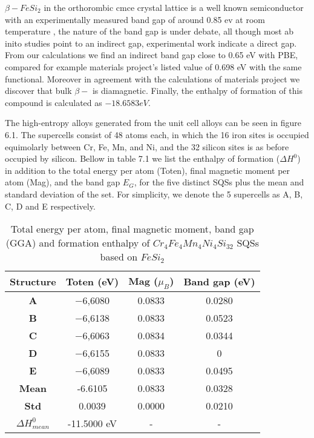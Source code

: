$\beta-FeSi_2$ in the orthorombic cmce crystal lattice is a well known semiconductor with an experimentally measured band gap of around 0.85 ev at room temperature \cite{PhysRevB.58.10389}, the nature of the band gap is under debate, all though most ab inito studies point to an indirect gap, experimental work indicate a direct gap. From our calculations we find an indirect band gap close to 0.65 eV with PBE, compared for example materials project's listed value of 0.698 eV with the same functional. Moreover in agreement with the calculations of materials project we discover that bulk $\beta-$  is diamagnetic. Finally, the enthalpy of formation of this compound is calculated as $-18.6583 eV$.

The high-entropy alloys generated from the  unit cell alloys can be seen in figure 6.1. The supercells consist of 48 atoms each, in which the 16 iron sites is occupied equimolarly between Cr, Fe, Mn, and Ni, and the 32 silicon sites is as before occupied by silicon. Bellow in table 7.1 we list the enthalpy of formation ($\Delta H^0$) in addition to the total energy per atom (Toten), final magnetic moment per atom (Mag), and the band gap $E_G$, for the five distinct SQSs plus the mean and standard deviation of the set. For simplicity, we denote the 5 supercells as A, B, C, D and E respectively.

\begin{table}[H]
\centering
\begin{tabular}{@{}cccc@{}}
\toprule
Structure  & Toten (eV) & Mag ($\mu_B$) & Band gap (eV) \\ \midrule
\textbf{A} & −6,6080                & 0.0833                    & 0.0280        \\
\textbf{B} & −6,6138                & 0.0833                    & 0.0523        \\
\textbf{C} & −6,6063                & 0.0834                    & 0.0344        \\
\textbf{D} & −6,6155                & 0.0833                    & 0             \\
\textbf{E} & −6,6089                & 0.0833                    & 0.0495        \\ \midrule
\textbf{Mean} & -6.6105 & 0.0833 & 0.0328    \\
\textbf{Std} & 0.0039 &  0.0000 &  0.0210 \\
\textbf{$\Delta H_{mean}^0$} & -11.5000 eV & - & - \\ \bottomrule
\end{tabular}
\caption{Total energy per atom, final magnetic moment, band gap (GGA) and formation enthalpy of $Cr_4Fe_4Mn_4Ni_4Si_{32}$ SQSs based on $FeSi_2$}
\label{table:fesi2_summary}
\end{table}  

